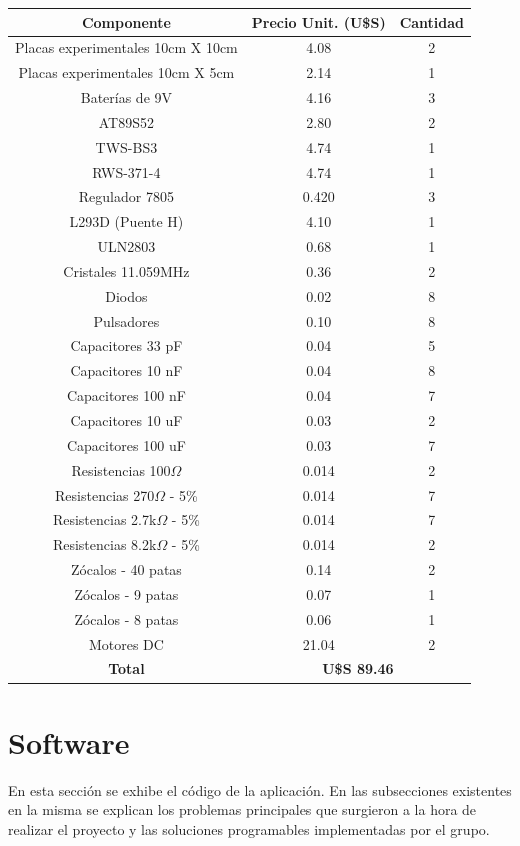 \documentclass[a4paper,10pt]{article}
\begin{document}
		\begin{tabular}{|c|c|c|}
			\hline
			\textbf{Componente} & \textbf{Precio Unit. (U\$S}) & \textbf{Cantidad} \\
			\hline
			Placas experimentales 10cm X 10cm & 4.08 & 2\\
			\hline
			Placas experimentales 10cm X 5cm & 2.14 & 1\\
			\hline
			Baterías de 9V & 4.16 & 3\\
			\hline
			AT89S52 & 2.80 & 2\\
			\hline
			TWS-BS3 & 4.74 & 1\\
			\hline
			RWS-371-4 & 4.74 & 1\\
			\hline
			Regulador 7805 & 0.420 & 3\\
			\hline
			L293D (Puente H) & 4.10 & 1\\
			\hline
			ULN2803 & 0.68 & 1\\
			\hline
			Cristales 11.059MHz & 0.36 & 2\\
			\hline
			Diodos & 0.02 & 8\\
			\hline
			Pulsadores & 0.10 & 8\\
			\hline
			Capacitores 33 pF & 0.04 & 5\\
			\hline
			Capacitores 10 nF & 0.04 & 8\\
			\hline
			Capacitores 100 nF & 0.04 & 7\\
			\hline
			Capacitores 10 uF & 0.03 & 2\\
			\hline
			Capacitores 100 uF & 0.03 & 7\\
			\hline
			Resistencias 100$\Omega$ & 0.014 & 2\\
			\hline
			Resistencias 270$\Omega$ - 5\% & 0.014& 7\\
			\hline
			Resistencias 2.7k$\Omega$ - 5\% & 0.014 & 7\\
			\hline
			Resistencias 8.2k$\Omega$ - 5\% & 0.014 & 2\\
			\hline
			Zócalos - 40 patas & 0.14 & 2\\
			\hline
			Zócalos - 9 patas & 0.07 & 1\\
			\hline
			Zócalos - 8 patas & 0.06 & 1\\
			\hline
			Motores DC & 21.04 & 2\\
			\hline
			\hline
			\textbf{Total} & \multicolumn{2}{|c|}{\textbf{U\$S 89.46}} \\
			\hline   
		\end{tabular}
	\section{Software}
		En esta sección se exhibe el código de la aplicación. En las subsecciones existentes en la misma se explican los problemas principales que surgieron
		a la hora de realizar el proyecto y las soluciones programables implementadas por el grupo.  
\end{document}
